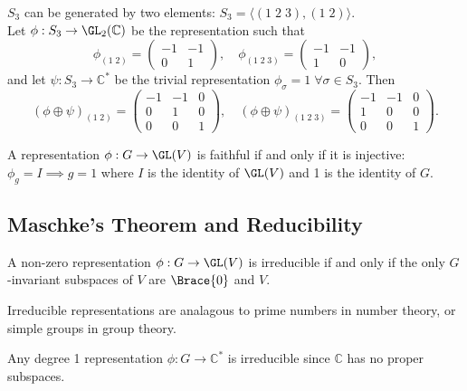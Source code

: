 \documentclass[../Project.tex]{subfiles}
\begin{document}
\begin{exam}[ \cite{1}]
	\label{1}
	$S_3$ can be generated by two elements: $S_3 = \langle (1\;2\;3),(1\;2)\rangle.$\\

	Let $\phi : S_3 \to \GL_2(\mathbb{C})$ be the representation such that 
	$$\phi_{(1\;2)} = \begin{pmatrix}-1 & -1\\0 & 1\end{pmatrix},\quad \phi_{(1\;2\;3)} = \begin{pmatrix}-1 & -1\\ 1 & 0\end{pmatrix},$$
	and let $\psi : S_3 \to \mathbb{C}^*$ be the trivial representation $\phi_\sigma = 1\;\forall \sigma \in S_3$. Then
	$$(\phi \oplus \psi)_{(1\;2)} = \begin{pmatrix}-1 & -1 & 0\\ 0 & 1 & 0\\0 & 0 & 1\end{pmatrix},\quad (\phi \oplus \psi)_{(1\;2\;3)} = \begin{pmatrix}-1 & -1 & 0\\1 & 0 & 0\\0 & 0 & 1\end{pmatrix}.$$
\end{exam}

\begin{defi}
	A representation $\phi : G \to \GL(V)$ is faithful if and only if it is injective: $\phi_g = I \implies g = 1$ where $I$ is the identity of $\GL(V)$ and 1 is the identity of $G$.
\end{defi}

\newpage
\subsection{Maschke's Theorem and Reducibility}
\begin{defi}
	A non-zero representation $\phi : G \to \GL(V)$ is irreducible if and only if the only $G$-invariant subspaces of $V$ are $\Brace{0}$ and $V$.
\end{defi}

Irreducible representations are analagous to prime numbers in number theory, or simple groups in group theory. 

\begin{lemm}[\cite{1}]
	Any degree 1 representation $\phi : G \to \mathbb{C}^*$ is irreducible since $\mathbb{C}$ has no proper subspaces.
\end{lemm}
\end{document}
